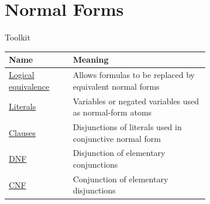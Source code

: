 \section{Normal Forms}

\begin{toolkitbox}{Toolkit}
\small
\begin{tabular}{l p{0.68\linewidth}}
\toprule
\textbf{Name} & \textbf{Meaning} \\
\midrule
\hyperref[def:logical-equivalence-propositional-logic]{Logical equivalence} & Allows formulas to be replaced by equivalent normal forms \\
\hyperref[def:literal-propositional-logic]{Literals} & Variables or negated variables used as normal-form atoms \\
\hyperref[def:clause-propositional-logic]{Clauses} & Disjunctions of literals used in conjunctive normal form \\
\hyperref[def:disjunctive-normal-form-propositional-logic]{DNF} & Disjunction of elementary conjunctions \\
\hyperref[def:conjunctive-normal-form-propositional-logic]{CNF} & Conjunction of elementary disjunctions \\
\bottomrule
\end{tabular}
\end{toolkitbox}












